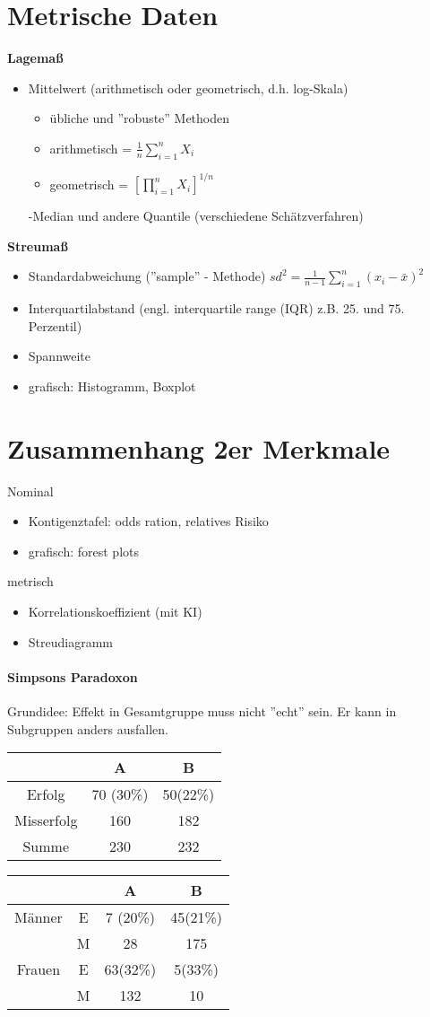 \section{Metrische Daten}
\textbf{Lagemaß}
\begin{itemize}
	\item Mittelwert (arithmetisch oder geometrisch, d.h. log-Skala)
	\begin{itemize}
		\item übliche und ''robuste'' Methoden
		\item arithmetisch  = $\frac{1}{n}\sum_{i=1}^{n} X_i$
		\item geometrisch  = $[ \prod_{i=1}^{n} X_i]^{1/n}$
	\end{itemize}
	-Median und andere Quantile (verschiedene Schätzverfahren)
\end{itemize}
\textbf{Streumaß}
\begin{itemize}
	\item Standardabweichung (''sample'' - Methode) $sd^2 = \frac{1}{n-1} \sum_{i=1}^{n}(x_i - \bar{x})^2$
	\item Interquartilabstand (engl. interquartile range (IQR) z.B. 25. und 75. Perzentil)
	\item Spannweite
	\item grafisch: Histogramm, Boxplot	
\end{itemize}

\section{Zusammenhang 2er Merkmale}
Nominal
\begin{itemize}
	\item Kontigenztafel: odds ration, relatives Risiko
	\item grafisch: forest plots
\end{itemize}
metrisch
\begin{itemize}
	\item Korrelationskoeffizient (mit KI)
	\item Streudiagramm
\end{itemize}

\paragraph{Simpsons Paradoxon}
Grundidee: Effekt in Gesamtgruppe muss nicht ''echt'' sein. Er kann in Subgruppen anders ausfallen.

\begin{tabular}{|c|c|c|}
	\hline 
	& A & B \\ 
	\hline 
	Erfolg & 70 (30\%) &  50(22\%) \\ 
	\hline 
	Misserfolg & 160 & 182 \\ 
	\hline 
	Summe & 230 & 232 \\ 
	\hline 
\end{tabular} 

\begin{tabular}{|c|c|c|c|}
	\hline 
	&   & A & B \\ 
	\hline 
	Männer & E & 7 (20\%) & 45(21\%) \\ 
	\hline 
	& M & 28 & 175 \\ 
	\hline 
	Frauen & E & 63(32\%) & 5(33\%) \\ 
	\hline 
	& M  & 132 & 10 \\ 
	\hline 
\end{tabular} 

